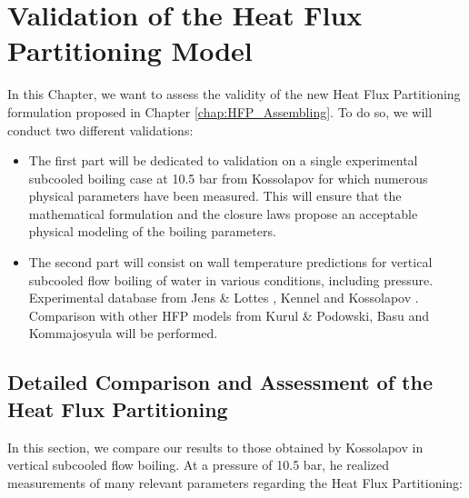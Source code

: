 
\chapter{Validation of the Heat Flux Partitioning Model} %

\label{ch:HFP_validation} %

\minitoc


In this Chapter, we want to assess the validity of the new Heat Flux Partitioning formulation proposed in Chapter \ref{chap:HFP_Assembling}. To do so, we will conduct two different validations:

\begin{itemize}
\setlength{\itemsep}{8pt}
\item The first part will be dedicated to validation on a single experimental subcooled boiling case at 10.5 bar from Kossolapov \cite{kossolapov_experimental_2021} for which numerous physical parameters have been measured. This will ensure that the mathematical formulation and the closure laws propose an acceptable physical modeling of the boiling parameters.

\item The second part will consist on wall temperature predictions for vertical subcooled flow boiling of water in various conditions, including pressure. Experimental database from Jens \& Lottes \cite{jens_analysis_1951}, Kennel \cite{kennel_local_1949} and Kossolapov \cite{kossolapov_experimental_2021}. Comparison with other HFP models from Kurul \& Podowski, Basu and Kommajosyula will be performed.
\end{itemize}


\section{Detailed Comparison and Assessment of the Heat Flux Partitioning}
\label{sec:hfp_valid_fullkoss}

In this section, we compare our results to those obtained by Kossolapov \cite{kossolapov_experimental_2021} in vertical subcooled flow boiling. At a pressure of 10.5 bar, he realized measurements of many relevant parameters regarding the Heat Flux Partitioning:

